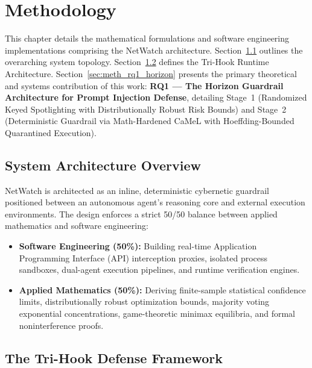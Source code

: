 \chapter{Methodology}
\label{ch:methodology}

This chapter details the mathematical formulations and software engineering implementations comprising the NetWatch architecture. Section~\ref{sec:meth_overview} outlines the overarching system topology. Section~\ref{sec:meth_trihook} defines the Tri-Hook Runtime Architecture. Section~\ref{sec:meth_rq1_horizon} presents the primary theoretical and systems contribution of this work: \textbf{RQ1 --- The Horizon Guardrail Architecture for Prompt Injection Defense}, detailing Stage~1 (Randomized Keyed Spotlighting with Distributionally Robust Risk Bounds) and Stage~2 (Deterministic Guardrail via Math-Hardened CaMeL with Hoeffding-Bounded Quarantined Execution).

\section{System Architecture Overview}
\label{sec:meth_overview}

NetWatch is architected as an inline, deterministic cybernetic guardrail positioned between an autonomous agent's reasoning core and external execution environments. The design enforces a strict 50/50 balance between applied mathematics and software engineering:
\begin{itemize}
    \item \textbf{Software Engineering (50\%):} Building real-time Application Programming Interface (API) interception proxies, isolated process sandboxes, dual-agent execution pipelines, and runtime verification engines.
    \item \textbf{Applied Mathematics (50\%):} Deriving finite-sample statistical confidence limits, distributionally robust optimization bounds, majority voting exponential concentrations, game-theoretic minimax equilibria, and formal noninterference proofs.
\end{itemize}

\section{The Tri-Hook Defense Framework}
\label{sec:meth_trihook}

